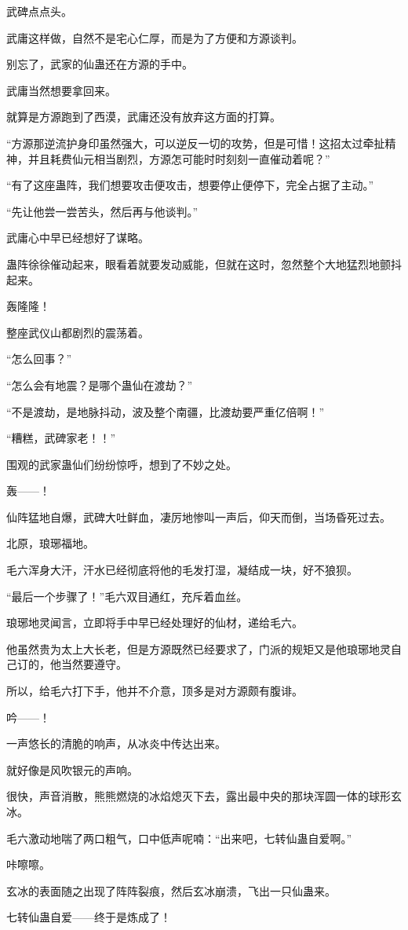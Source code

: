\begin{this_body}
武碑点点头。

武庸这样做，自然不是宅心仁厚，而是为了方便和方源谈判。

别忘了，武家的仙蛊还在方源的手中。

武庸当然想要拿回来。

就算是方源跑到了西漠，武庸还没有放弃这方面的打算。

“方源那逆流护身印虽然强大，可以逆反一切的攻势，但是可惜！这招太过牵扯精神，并且耗费仙元相当剧烈，方源怎可能时时刻刻一直催动着呢？”

“有了这座蛊阵，我们想要攻击便攻击，想要停止便停下，完全占据了主动。”

“先让他尝一尝苦头，然后再与他谈判。”

武庸心中早已经想好了谋略。

蛊阵徐徐催动起来，眼看着就要发动威能，但就在这时，忽然整个大地猛烈地颤抖起来。

轰隆隆！

整座武仪山都剧烈的震荡着。

“怎么回事？”

“怎么会有地震？是哪个蛊仙在渡劫？”

“不是渡劫，是地脉抖动，波及整个南疆，比渡劫要严重亿倍啊！”

“糟糕，武碑家老！！”

围观的武家蛊仙们纷纷惊呼，想到了不妙之处。

轰——！

仙阵猛地自爆，武碑大吐鲜血，凄厉地惨叫一声后，仰天而倒，当场昏死过去。

北原，琅琊福地。

毛六浑身大汗，汗水已经彻底将他的毛发打湿，凝结成一块，好不狼狈。

“最后一个步骤了！”毛六双目通红，充斥着血丝。

琅琊地灵闻言，立即将手中早已经处理好的仙材，递给毛六。

他虽然贵为太上大长老，但是方源既然已经要求了，门派的规矩又是他琅琊地灵自己订的，他当然要遵守。

所以，给毛六打下手，他并不介意，顶多是对方源颇有腹诽。

吟——！

一声悠长的清脆的响声，从冰炎中传达出来。

就好像是风吹银元的声响。

很快，声音消散，熊熊燃烧的冰焰熄灭下去，露出最中央的那块浑圆一体的球形玄冰。

毛六激动地喘了两口粗气，口中低声呢喃：“出来吧，七转仙蛊自爱啊。”

咔嚓嚓。

玄冰的表面随之出现了阵阵裂痕，然后玄冰崩溃，飞出一只仙蛊来。

七转仙蛊自爱——终于是炼成了！

\end{this_body}

